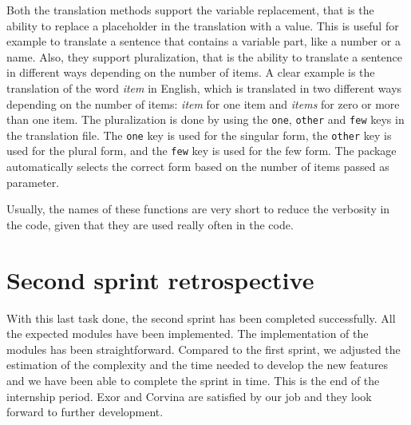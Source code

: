 Both the translation methods support the variable replacement, that is the ability to replace a placeholder in the translation with a value. This is useful for example to translate a sentence that contains a variable part, like a number or a name. Also, they support pluralization, that is the ability to translate a sentence in different ways depending on the number of items. A clear example is the translation of the word \textit{item} in English, which is translated in two different ways depending on the number of items: \textit{item} for one item and \textit{items} for zero or more than one item. The pluralization is done by using the \texttt{one}, \texttt{other} and \texttt{few} keys in the translation file. The \texttt{one} key is used for the singular form, the \texttt{other} key is used for the plural form, and the \texttt{few} key is used for the few form. The package automatically selects the correct form based on the number of items passed as parameter.

Usually, the names of these functions are very short to reduce the verbosity in the code, given that they are used really often in the code.

\section{Second sprint retrospective}

With this last task done, the second sprint has been completed successfully. All the expected modules have been implemented. The implementation of the modules has been straightforward. Compared to the first sprint, we adjusted the estimation of the complexity and the time needed to develop the new features and we have been able to complete the sprint in time. This is the end of the internship period. Exor and Corvina are satisfied by our job and they look forward to further development.

